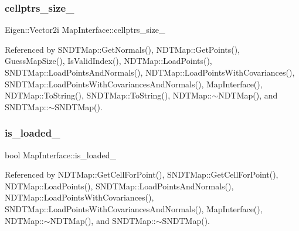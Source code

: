 \mbox{\label{classMapInterface_ae7400134de8e386c99823aa24f25c799}} 
\subsubsection{\texorpdfstring{cellptrs\+\_\+size\+\_\+}{cellptrs\_size\_}}
{\footnotesize\ttfamily Eigen\+::\+Vector2i Map\+Interface\+::cellptrs\+\_\+size\+\_\+\hspace{0.3cm}{\ttfamily [protected]}}



Referenced by S\+N\+D\+T\+Map\+::\+Get\+Normals(), N\+D\+T\+Map\+::\+Get\+Points(), Guess\+Map\+Size(), Is\+Valid\+Index(), N\+D\+T\+Map\+::\+Load\+Points(), S\+N\+D\+T\+Map\+::\+Load\+Points\+And\+Normals(), N\+D\+T\+Map\+::\+Load\+Points\+With\+Covariances(), S\+N\+D\+T\+Map\+::\+Load\+Points\+With\+Covariances\+And\+Normals(), Map\+Interface(), N\+D\+T\+Map\+::\+To\+String(), S\+N\+D\+T\+Map\+::\+To\+String(), N\+D\+T\+Map\+::$\sim$\+N\+D\+T\+Map(), and S\+N\+D\+T\+Map\+::$\sim$\+S\+N\+D\+T\+Map().

\mbox{\label{classMapInterface_a9f323066b687763076c9fdca1e370e2a}} 
\subsubsection{\texorpdfstring{is\+\_\+loaded\+\_\+}{is\_loaded\_}}
{\footnotesize\ttfamily bool Map\+Interface\+::is\+\_\+loaded\+\_\+\hspace{0.3cm}{\ttfamily [protected]}}



Referenced by N\+D\+T\+Map\+::\+Get\+Cell\+For\+Point(), S\+N\+D\+T\+Map\+::\+Get\+Cell\+For\+Point(), N\+D\+T\+Map\+::\+Load\+Points(), S\+N\+D\+T\+Map\+::\+Load\+Points\+And\+Normals(), N\+D\+T\+Map\+::\+Load\+Points\+With\+Covariances(), S\+N\+D\+T\+Map\+::\+Load\+Points\+With\+Covariances\+And\+Normals(), Map\+Interface(), N\+D\+T\+Map\+::$\sim$\+N\+D\+T\+Map(), and S\+N\+D\+T\+Map\+::$\sim$\+S\+N\+D\+T\+Map().

\mbox{\label{classMapInterface_a4a93205a5de9eb328fae48138c0cbb4c}} 
